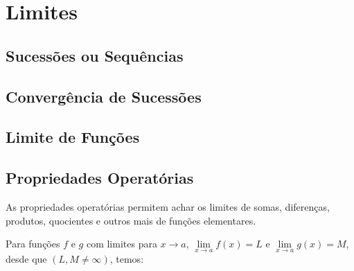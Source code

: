 \section{Limites}

	\subsection{Sucessões ou Sequências \cite{morettin}}

	\subsection{Convergência de Sucessões \cite{morettin}}

	\subsection{Limite de Funções \cite{morettin}}

	\subsection{Propriedades Operatórias \cite{somatematica} \cite{ventura}}

		As propriedades operatórias permitem achar os limites de somas, diferenças, produtos, quocientes e outros mais de funções elementares.
		
		Para funções $f$ e $g$ com limites para $x \to a$, $\lim \limits_{x \to a} f(x) = L$ e $\lim \limits_{x \to a} g(x) = M$, desde que $(L, M \neq \infty )$, temos:

		\medskip

